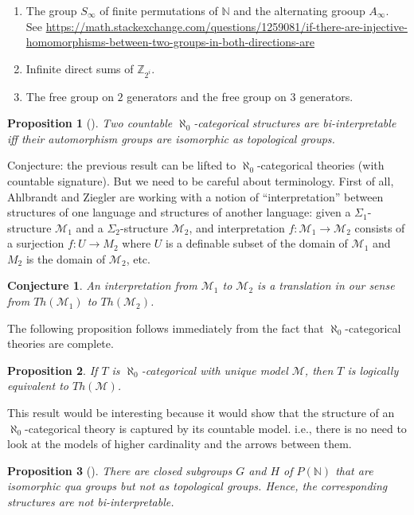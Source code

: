 \documentclass[12pt]{article}
\newtheorem*{conj}{Conjecture}
\newtheorem*{prop}{Proposition}
\theoremstyle{definition}
\newcommand{\3}{\mathcal}
\begin{document}
\begin{enumerate}
\item The group $S_\infty$ of finite permutations of $\mathbb{N}$ and
  the alternating grooup $A_\infty$. See  \url{https://math.stackexchange.com/questions/1259081/if-there-are-injective-homomorphisms-between-two-groups-in-both-directions-are}
\item Infinite direct sums of $\mathbb{Z}_{2^i}$.
\item The free group on $2$ generators and the free group on $3$ generators.  
\end{enumerate}

\begin{prop}[\cite{ahlbrandt1986}] Two countable
  $\aleph _0$-categorical structures are bi-interpretable iff their
  automorphism groups are isomorphic as topological groups. \end{prop}

Conjecture: the previous result can be lifted to
$\aleph _0$-categorical theories (with countable signature). But we
need to be careful about terminology. First of all, Ahlbrandt and
Ziegler are working with a notion of ``interpretation'' between
structures of one language and structures of another language: given a
$\Sigma _1$-structure $\3M _1$ and a $\Sigma _2$-structure $\3M _2$,
and interpretation $f:\3M_1\to \3M_2$ consists of a surjection
$f:U\to M_2$ where $U$ is a definable subset of the domain of $\3M_1$
and $M_2$ is the domain of $\3M_2$, etc.

\begin{conj} An interpretation from $\3M_1$ to $\3M_2$ is a
  translation in our sense from $Th(\3M_1)$ to $Th(\3M_2)$. \end{conj}

The following proposition follows immediately from the fact that
$\aleph _0$-categorical theories are complete.

\begin{prop} If $T$ is $\aleph _0$-categorical with unique model
  $\3M$, then $T$ is logically equivalent to $Th(\3M )$. \end{prop}

This result would be interesting because it would show that the
structure of an $\aleph _0$-categorical theory is captured by its
countable model. i.e., there is no need to look at the models of
higher cardinality and the arrows between them.

\begin{prop}[\cite{evans1990}] There are closed subgroups $G$ and $H$
  of $P(\mathbb{N})$ that are isomorphic qua groups but not as
  topological groups. Hence, the corresponding structures are not
  bi-interpretable. \end{prop}
\end{document}
